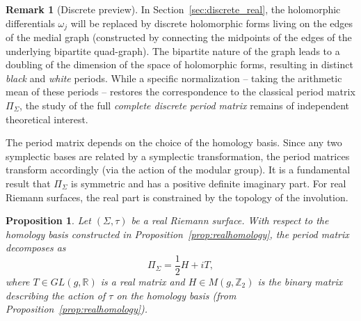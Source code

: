 \documentclass[11pt,a4paper]{article}
\newtheorem{proposition}[theorem]{Proposition}
\theoremstyle{definition}
\newtheorem*{remark}{Remark}
\newcommand{\R}{\mathds{R}}
\newcommand{\Z}{\mathds{Z}}
\begin{document}
\begin{remark}[Discrete preview]
	In Section~\ref{sec:discrete_real}, the holomorphic differentials $\omega_j$ will be replaced by discrete holomorphic forms living on the edges of the medial graph (constructed by connecting the midpoints of the edges of the underlying bipartite quad-graph). The bipartite nature of the graph leads to a doubling of the dimension of the space of holomorphic forms, resulting in distinct \emph{black} and \emph{white} periods. While a specific normalization -- taking the arithmetic mean of these periods -- restores the correspondence to the classical period matrix $\Pi_{\Sigma}$, the study of the full \emph{complete discrete period matrix} remains of independent theoretical interest.
\end{remark}

The period matrix depends on the choice of the homology basis. Since any two symplectic bases are related by a symplectic transformation, the period matrices transform accordingly (via the action of the modular group). It is a fundamental result that $\Pi_{\Sigma}$ is symmetric and has a positive definite imaginary part. For real Riemann surfaces, the real part is constrained by the topology of the involution.

\begin{proposition}\label{prop:matrix_smooth}
	Let $(\Sigma, \tau)$ be a real Riemann surface. With respect to the homology basis constructed in Proposition~\ref{prop:realhomology}, the period matrix decomposes as
	\[
	\Pi_{\Sigma} = \frac{1}{2} H + i T,
	\]
	where $T \in GL(g, \R)$ is a real matrix and $H \in M(g, \Z_2)$ is the binary matrix describing the action of $\tau$ on the homology basis (from Proposition~\ref{prop:realhomology}).
\end{proposition}
\end{document}
